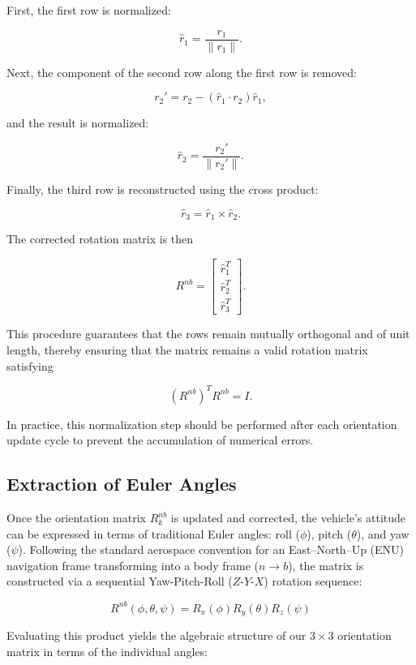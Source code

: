 \documentclass{article}
\begin{document}
First, the first row is normalized:

\[
\hat r_1 = \frac{r_1}{\|r_1\|}.
\]

Next, the component of the second row along the first row is removed:

\[
r_2' = r_2 - (\hat r_1 \cdot r_2)\hat r_1,
\]

and the result is normalized:

\[
\hat r_2 = \frac{r_2'}{\|r_2'\|}.
\]

Finally, the third row is reconstructed using the cross product:

\[
\hat r_3 = \hat r_1 \times \hat r_2.
\]

The corrected rotation matrix is then

\[
R^{nb} =
\begin{bmatrix}
	\hat r_1^T \\
	\hat r_2^T \\
	\hat r_3^T
\end{bmatrix}.
\]

\vspace{1em}
\noindent This procedure guarantees that the rows remain mutually orthogonal and of unit length, thereby ensuring that the matrix remains a valid rotation matrix satisfying

\[
(R^{nb})^T R^{nb} = I.
\]

\vspace{1em}
\noindent In practice, this normalization step should be performed after each orientation update cycle to prevent the accumulation of numerical errors.

\subsection{Extraction of Euler Angles}

Once the orientation matrix $R_{k}^{nb}$ is updated and corrected, the vehicle's attitude can be expressed in terms of traditional Euler angles: roll ($\phi$), pitch ($\theta$), and yaw ($\psi$). Following the standard aerospace convention for an East--North--Up (ENU) navigation frame transforming into a body frame ($n \rightarrow b$), the matrix is constructed via a sequential Yaw-Pitch-Roll ($Z$-$Y$-$X$) rotation sequence:

\[
R^{nb}(\phi, \theta, \psi) = R_x(\phi) R_y(\theta) R_z(\psi)
\]

\noindent Evaluating this product yields the algebraic structure of our $3\times3$ orientation matrix in terms of the individual angles:
\end{document}
